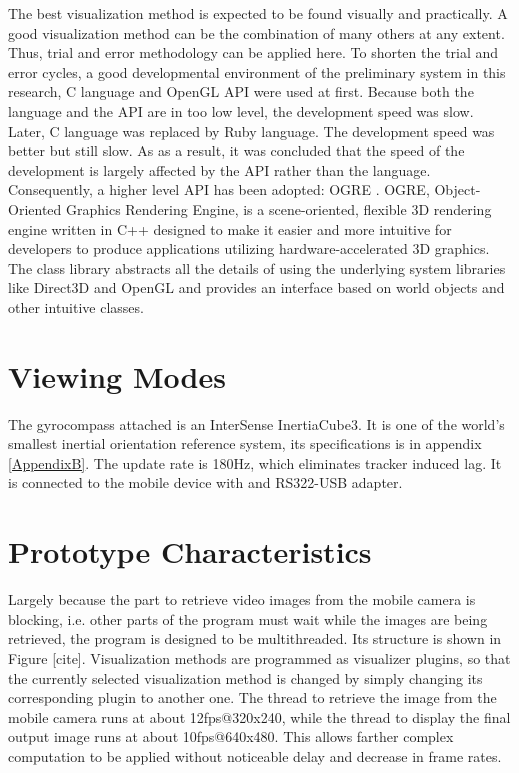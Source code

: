 The best visualization method is expected to be found visually and practically. A good visualization method can be the combination of many others at any extent. Thus, trial and error methodology can be applied here. To shorten the trial and error cycles, a good developmental environment of the preliminary system in this research, C language and OpenGL API \citep{Reference10} were used at first. Because both the language and the API are in too low level, the development speed was slow. Later, C language was replaced by Ruby language. The development speed was better but still slow. As as a result, it was concluded that the speed of the development is largely affected by the API rather than the language. Consequently, a higher level API has been adopted: OGRE \citep{Reference11}. OGRE, Object-Oriented Graphics Rendering Engine, is a scene-oriented, flexible 3D rendering engine written in C++ designed to make it easier and more intuitive for developers to produce applications utilizing hardware-accelerated 3D graphics. The class library abstracts all the details of using the underlying system libraries like Direct3D and OpenGL and provides an interface based on world objects and other intuitive classes.

\section{Viewing Modes}

The gyrocompass attached is an InterSense InertiaCube3. It is one of the world's smallest inertial orientation reference system, its specifications is in appendix \ref{AppendixB}. The update rate is 180Hz, which eliminates tracker induced lag. It is connected to the mobile device with and RS322-USB adapter.
	
\section{Prototype Characteristics}

Largely because the part to retrieve video images from the mobile camera is blocking, i.e. other parts of the program must wait while the images are being retrieved, the program is designed to be multithreaded. Its structure is shown in Figure [cite]. Visualization methods are programmed as visualizer plugins, so that the currently selected visualization method is changed by simply changing its corresponding plugin to another one. The thread to retrieve the image from the mobile camera runs at about 12fps@320x240, while the thread to display the final output image runs at about 10fps@640x480. This allows farther complex computation to be applied without noticeable delay and decrease in frame rates.

